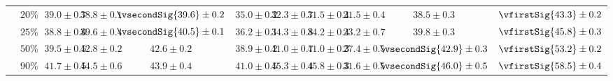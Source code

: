 \begin{longtable}{lrcccc|ccccc}
                                                  & $20\%$ &               $39.0 \pm 0.7$  &               $38.8 \pm 0.1$  &  $\vsecondSig{39.6} \pm 0.2$  &  $35.0 \pm 0.2$  &  $32.3 \pm 0.7$  &  $31.5 \pm 0.4$  &  $21.5 \pm 0.4$  &               $38.5 \pm 0.3$  &  $\vfirstSig{43.3} \pm 0.2$  \\
                                                  & $25\%$ &               $38.8 \pm 0.6$  &               $39.6 \pm 0.4$  &  $\vsecondSig{40.5} \pm 0.1$  &  $36.2 \pm 0.1$  &  $34.3 \pm 0.8$  &  $34.2 \pm 0.4$  &  $23.2 \pm 0.7$  &               $39.8 \pm 0.3$  &  $\vfirstSig{45.8} \pm 0.3$  \\
                                                  & $50\%$ &               $39.5 \pm 0.5$  &               $42.8 \pm 0.2$  &               $42.6 \pm 0.2$  &  $38.9 \pm 0.2$  &  $41.0 \pm 0.7$  &  $41.0 \pm 0.3$  &  $27.4 \pm 0.5$  &  $\vsecondSig{42.9} \pm 0.3$  &  $\vfirstSig{53.2} \pm 0.2$  \\
                                                  & $90\%$ &               $41.7 \pm 0.5$  &               $44.5 \pm 0.6$  &               $43.9 \pm 0.4$  &  $41.0 \pm 0.5$  &  $45.3 \pm 0.4$  &  $45.8 \pm 0.3$  &  $31.6 \pm 0.5$  &  $\vsecondSig{46.0} \pm 0.5$  &  $\vfirstSig{58.5} \pm 0.4$  \\
    \bottomrule
  \end{longtable}
\endgroup
